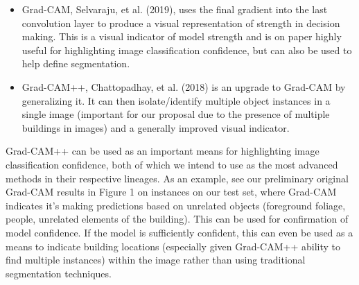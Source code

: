 \documentclass{article}
\begin{document}
\begin{itemize} %
    \item Grad-CAM, Selvaraju, et al.\cite{selvaraju} (2019), uses the final gradient into the last convolution layer to produce a visual representation of strength in decision making. This is a visual indicator of model strength and is on paper highly useful for highlighting image classification confidence, but can also be used to help define segmentation. 
    \item Grad-CAM++, Chattopadhay, et al.\cite{chattopadhay} (2018) is an upgrade to Grad-CAM by generalizing it. It can then isolate/identify multiple object instances in a single image (important for our proposal due to the presence of multiple buildings in images) and a generally improved visual indicator. 
\end{itemize}

Grad-CAM++ can be used as an important means for highlighting image classification confidence, both of which we intend to use as the most advanced methods in their respective lineages. As an example, see our preliminary original Grad-CAM results in Figure 1 on instances on our test set, where Grad-CAM indicates it's making predictions based on unrelated objects (foreground foliage, people, unrelated elements of the building). This can be used for confirmation of model confidence. If the model is sufficiently confident, this can even be used as a means to indicate building locations (especially given Grad-CAM++ ability to find multiple instances) within the image rather than using traditional segmentation techniques.
\end{document}
